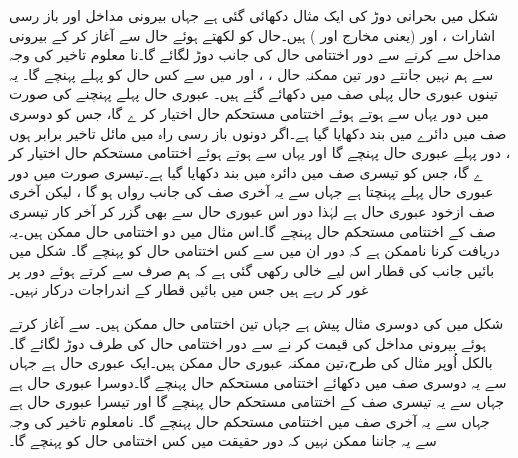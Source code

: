 شکل   میں بحرانی دوڑ کی ایک مثال دکھائی گئی ہے جہاں بیرونی مداخل  اور باز رسی   اشارات ،  اور  (یعنی مخارج  اور ) ہیں۔حال کو   لکھتے ہوئے حال  سے آغاز کر کے بیرونی مداخل  سے  کرنے سے دور اختتامی حال کی جانب دوڑ لگائے گا۔نا معلوم تاخیر کی وجہ سے ہم نہیں جانتے دور تین ممکنہ حال ، ، اور  میں سے کس حال کو پہلے پہنچے گا۔ یہ تینوں عبوری حال پہلی صف میں دکھائے گئے ہیں۔ عبوری حال  پہلے پہنچنے کی صورت میں دور یہاں سے ہوتے ہوئے اختتامی مستحکم حال  اختیار کر ے گا، جس کو دوسری صف میں دائرے میں بند دکھایا گیا ہے۔اگر دونوں باز رسی راہ میں مائل تاخیر برابر ہوں ، دور پہلے  عبوری حال   پہنچے گا اور یہاں سے ہوتے ہوئے اختتامی مستحکم حال  اختیار کر ے گا، جس کو تیسری صف میں دائرہ میں بند دکھایا گیا ہے۔تیسری صورت میں دور عبوری حال  پہلے پہنچتا ہے جہاں سے یہ آخری صف کی جانب رواں ہو گا ، لیکن آخری صف ازخود عبوری حال ہے لہٰذا دور اس عبوری حال سے بھی گزر کر آخر کار تیسری صف کے اختتامی مستحکم حال  پہنچے گا۔اس مثال میں دو اختتامی حال ممکن ہیں۔یہ دریافت کرنا ناممکن ہے کہ دور ان میں سے کس اختتامی حال کو پہنچے گا۔ شکل میں بائیں جانب  کی قطار اس لیے خالی رکھی گئی ہے کہ ہم صرف  سے  کرتے ہوئے دور پر غور کر رہے ہیں جس میں بائیں قطار کے اندراجات درکار نہیں۔

شکل   میں  کی دوسری مثال پیش  ہے جہاں تین اختتامی حال ممکن ہیں۔   سے آغاز کرتے ہوئے بیرونی مداخل  کی قیمت  کر نے سے دور اختتامی حال کی طرف دوڑ لگائے گا۔بالکل اُوپر مثال کی طرح،تین ممکنہ عبوری حال  ممکن ہیں۔ایک عبوری حال  ہے جہاں سے یہ دوسری صف میں دکھائے اختتامی مستحکم حال  پہنچے گا۔دوسرا عبوری حال  ہے جہاں سے یہ تیسری صف کے اختتامی مستحکم حال  پہنچے گا اور تیسرا عبوری حال  ہے جہاں سے یہ آخری صف میں   اختتامی مستحکم حال  پہنچے گا۔ نامعلوم تاخیر کی وجہ سے یہ جاننا ممکن نہیں کہ دور حقیقت میں کس اختتامی حال کو پہنچے گا۔


